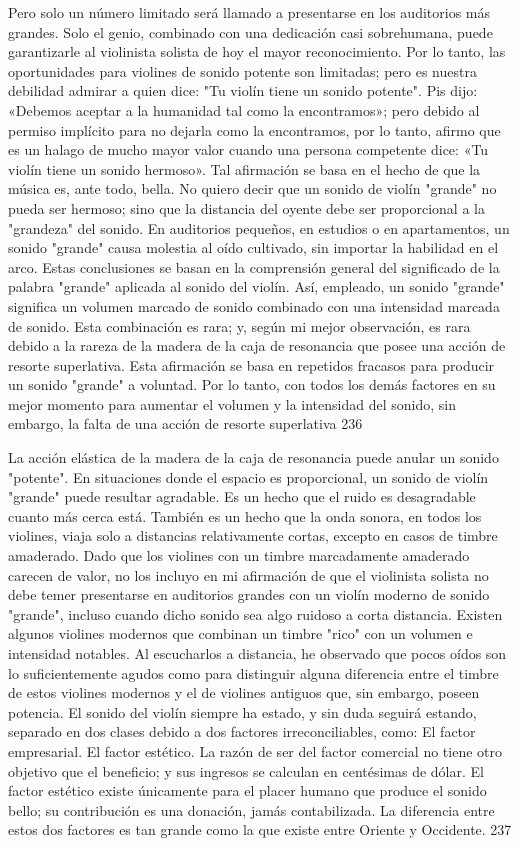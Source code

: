 Pero solo un número limitado será llamado a presentarse en los auditorios más grandes. Solo el genio, combinado con una dedicación casi sobrehumana, puede garantizarle al violinista solista de hoy el mayor reconocimiento. Por lo tanto, las oportunidades para violines de sonido potente son limitadas; pero es nuestra debilidad admirar a quien dice: "Tu violín tiene un sonido potente".
Pis dijo: «Debemos aceptar a la humanidad tal como la encontramos»; pero debido al permiso implícito para no dejarla como la encontramos, por lo tanto, afirmo que es un halago de mucho mayor valor cuando una persona competente dice: «Tu violín tiene un sonido hermoso». Tal afirmación se basa en el hecho de que la música es, ante todo, bella. No quiero decir que un sonido de violín "grande" no pueda ser hermoso; sino que la distancia del oyente debe ser proporcional a la "grandeza" del sonido. En auditorios pequeños, en estudios o en apartamentos, un sonido "grande" causa molestia al oído cultivado, sin importar la habilidad en el arco. Estas conclusiones se basan en la comprensión general del significado de la palabra "grande" aplicada al sonido del violín. Así, empleado, un sonido "grande" significa un volumen marcado de sonido combinado con una intensidad marcada de sonido. Esta combinación es rara; y, según mi mejor observación, es rara debido a la rareza de la madera de la caja de resonancia que posee una acción de resorte superlativa. Esta afirmación se basa en repetidos fracasos para producir un sonido "grande" a voluntad. Por lo tanto, con todos los demás factores en su mejor momento para aumentar el volumen y la intensidad del sonido, sin embargo, la falta de una acción de resorte superlativa
236

La acción elástica de la madera de la caja de resonancia puede anular un sonido "potente".
En situaciones donde el espacio es proporcional, un sonido de violín "grande" puede resultar agradable. Es un hecho que el ruido es desagradable cuanto más cerca está. También es un hecho que la onda sonora, en todos los violines, viaja solo a distancias relativamente cortas, excepto en casos de timbre amaderado. Dado que los violines con un timbre marcadamente amaderado carecen de valor, no los incluyo en mi afirmación de que el violinista solista no debe temer presentarse en auditorios grandes con un violín moderno de sonido "grande", incluso cuando dicho sonido sea algo ruidoso a corta distancia. Existen algunos violines modernos que combinan un timbre "rico" con un volumen e intensidad notables. Al escucharlos a distancia, he observado que pocos oídos son lo suficientemente agudos como para distinguir alguna diferencia entre el timbre de estos violines modernos y el de violines antiguos que, sin embargo, poseen potencia.
El sonido del violín siempre ha estado, y sin duda seguirá estando, separado en dos clases debido a dos factores irreconciliables, como:
El factor empresarial.
El factor estético.
La razón de ser del factor comercial no tiene otro objetivo que el beneficio; y sus ingresos se calculan en centésimas de dólar.
El factor estético existe únicamente para el placer humano que produce el sonido bello; su contribución es una donación, jamás contabilizada. La diferencia entre estos dos factores es tan grande como la que existe entre Oriente y Occidente.
237

